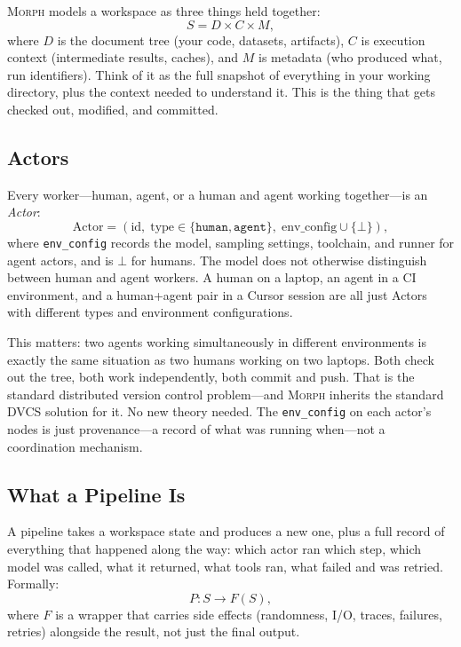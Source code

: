\documentclass{article}
\begin{document}
\textsc{Morph} models a workspace as three things held together:
\begin{equation}
  S = D \times C \times M,
\end{equation}
where $D$ is the document tree (your code, datasets, artifacts), $C$ is
execution context (intermediate results, caches), and $M$ is metadata (who
produced what, run identifiers). Think of it as the full snapshot of everything
in your working directory, plus the context needed to understand it. This is
the thing that gets checked out, modified, and committed.

\subsection{Actors}

Every worker---human, agent, or a human and agent working together---is an
\emph{Actor}:
\begin{equation}
  \text{Actor} = (\text{id},\; \text{type} \in \{\texttt{human},
  \texttt{agent}\},\; \text{env\_config} \cup \{\bot\}),
\end{equation}
where \texttt{env\_config} records the model, sampling settings, toolchain,
and runner for agent actors, and is $\bot$ for humans. The model does not
otherwise distinguish between human and agent workers. A human on a laptop, an
agent in a CI environment, and a human+agent pair in a Cursor session are all
just Actors with different types and environment configurations.

This matters: two agents working simultaneously in different environments is
exactly the same situation as two humans working on two laptops. Both check out
the tree, both work independently, both commit and push. That is the standard
distributed version control problem---and \textsc{Morph} inherits the standard
DVCS solution for it. No new theory needed. The \texttt{env\_config} on each
actor's nodes is just provenance---a record of what was running when---not a
coordination mechanism.

\subsection{What a Pipeline Is}

A pipeline takes a workspace state and produces a new one, plus a full record
of everything that happened along the way: which actor ran which step, which
model was called, what it returned, what tools ran, what failed and was retried.
Formally:
\begin{equation}
  P : S \to F(S),
\end{equation}
where $F$ is a wrapper that carries side effects (randomness, I/O, traces,
failures, retries) alongside the result, not just the final output.
\end{document}
